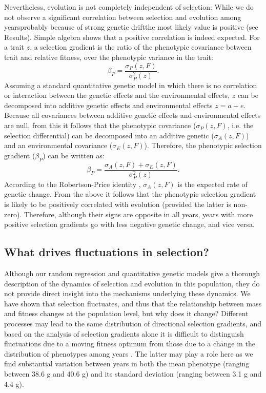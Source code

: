 Nevertheless, evolution is not completely independent of selection: While we do not observe a significant correlation between selection and evolution among years\textemdash probably because of strong genetic drift\textemdash the most likely value is positive (see Results). 
Simple algebra shows that a positive correlation is indeed expected. For a trait $z$, a selection gradient is the ratio of the phenotypic covariance between trait and relative fitness, over the phenotypic variance in the trait:
\begin{equation*}
\beta_P = \frac{\sigma_P(z, F)}{\sigma^2_P(z)} \text{.}
\end{equation*}
Assuming a standard quantitative genetic model in which there is no correlation or interaction between the genetic effects and the environmental effects, $z$ can be decomposed into additive genetic effects and environmental effects $z = a + e$. Because all covariances between additive genetic effects and environmental effects are null, from this it follows that the phenotypic covariance ($\sigma_P(z, F)$, i.e. the selection differential) can be decomposed into an additive genetic ($\sigma_A(z,F)$) and an environmental covariance ($\sigma_E(z,F)$). Therefore, the phenotypic selection gradient ($\beta_P$) can be written as:
\begin{equation*}
\beta_P = \frac{\sigma_A(z,F)+\sigma_E(z,F)}{\sigma^2_P(z)} \text{.}
\end{equation*}
According to the Robertson-Price identity \parencite{Robertson1966, Price1970}, $\sigma_A(z,F)$ is the expected rate of genetic change. From the above it follows that the phenotypic selection gradient is likely to be positively correlated with evolution (provided the latter is non-zero). Therefore, although their signs are opposite in all years, years with more positive selection gradients go with less negative genetic change, and vice versa. 

\subsection*{What drives fluctuations in selection?}
Although our random regression and quantitative genetic models give a thorough description of the dynamics of selection and evolution in this population, they do not provide direct insight into the mechanisms underlying these dynamics. We have shown that selection fluctuates, and thus that the relationship between mass and fitness changes at the population level, but why does it change? Different processes may lead to the same distribution of directional selection gradients, and based on the analysis of selection gradients alone it is difficult to distinguish fluctuations due to a moving fitness optimum from those due to a change in the distribution of phenotypes among years \parencite{Chevin2014}. The latter may play a role here as we find substantial variation between years in both the mean phenotype (ranging between 38.6 g and 40.6 g) and its standard deviation (ranging between 3.1 g and 4.4 g).

